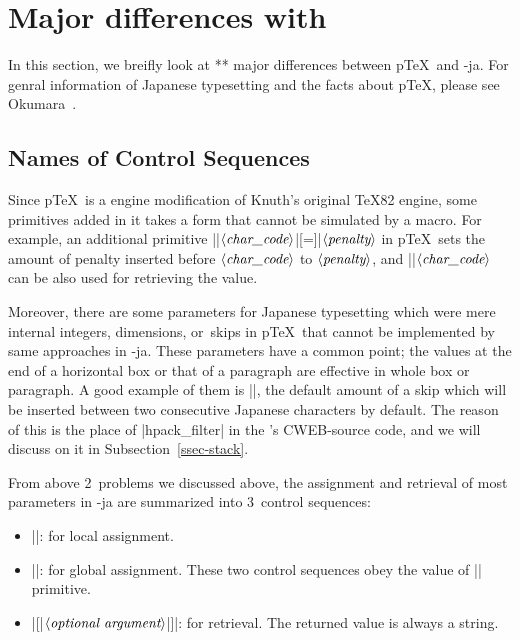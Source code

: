 \documentclass{ajt}
\begin{document}
\section{Major differences with \pTeX}
In this section, we breifly look at ** major differences between p\TeX\ and \LuaTeX-ja.
For genral information of Japanese typesetting and the facts about p\TeX, please see Okumara~\cite{ptexjp}.


\subsection{Names of Control Sequences}
\label{ssec-csname}
Since p\TeX\ is a engine modification of Knuth's original \TeX82 engine,
some primitives added in it takes a form that cannot be simulated by a
macro.  For example, an additional primitive
|\prebreakpenalty|$\langle\hbox{\it
char\_code}\rangle$|[=]|$\langle\hbox{\it penalty}\rangle$ in p\TeX\ sets
the amount of penalty inserted before $\langle\hbox{\it
char\_code}\rangle$ to $\langle\hbox{\it penalty}\rangle$, and |\prebreakpenalty|$\langle\hbox{\it
char\_code}\rangle$ can be also used for retrieving the value.

Moreover, there are some parameters for Japanese typesetting which were
mere internal integers, dimensions, or~skips in p\TeX\ that cannot be
implemented by same approaches in \LuaTeX-ja.  These parameters have a
common point; the values at the end of a horizontal box or that of a
paragraph are effective in whole box or paragraph.  A good example of
them is |\kanjiskip|, the default amount of a skip which will be
inserted between two consecutive Japanese characters by default.  The
reason of this is the place of |hpack_filter| in the \LuaTeX's
CWEB-source code, and we will discuss on it in
Subsection~\ref{ssec-stack}.

From above 2~problems we discussed above, the assignment and retrieval
of most parameters in \LuaTeX-ja are summarized into 3~control sequences:
\begin{itemize}
\item ||: for local
      assignment.
\item |\ltjglobalsetparameter|: for global assignment. These two control
      sequences obey the value of |\globaldefs| primitive.
\item |[{|$\langle\hbox{\it optional
      argument}\rangle$|}]|: for retrieval. The returned value is always
      a string.
\end{itemize}
\end{document}
